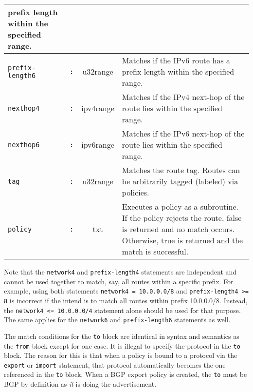 \begin{center}
\begin{tabular}{|l|c|c|p{5.5cm}|}
prefix length within the specified range. \\
\hline
{\tt prefix-length6} & {\tt :} & u32range & Matches if the IPv6 route has a
prefix length within the specified range. \\
\hline
{\tt nexthop4} & {\tt :} & ipv4range & Matches if the IPv4 next-hop of the route
lies within the specified range.\\
\hline
{\tt nexthop6} & {\tt :} & ipv6range & Matches if the IPv6 next-hop of the route
lies within the specified range. \\
\hline
{\tt tag} & {\tt :} & u32range & Matches the route tag.  Routes can be
arbitrarily tagged (labeled) via policies. \\
\hline
{\tt policy} & {\tt :} & txt & Executes a policy as a subroutine.  If the policy
rejects the route, false is returned and no match occurs.  Otherwise, true is
returned and the match is successful. \\
\hline
\end{tabular}
\end{center}

Note that the {\tt network4} and {\tt prefix-length4} statements
are independent and cannot be used together to match, say, all routes
within a specific prefix. For example, using both statements
{\tt network4 = 10.0.0.0/8} and {\tt prefix-length4 >= 8} is incorrect
if the intend is to match all routes within prefix 10.0.0.0/8.
Instead, the {\tt network4 <= 10.0.0.0/4} statement alone should be used
for that purpose.
The same applies for the {\tt network6} and {\tt prefix-length6}
statements as well.

The match conditions for the {\tt to} block are identical in syntax and
semantics as the {\tt from} block except for one case.  It is illegal to specify
the protocol in the {\tt to} block.  The reason for this is that when a policy
is bound to a protocol via the {\tt export} or {\tt import} statement, that
protocol automatically becomes the one referenced in the {\tt to} block.  When a
BGP export policy is created, the {\tt to} must be BGP by definition as {\em it}
is doing the advertisement.

